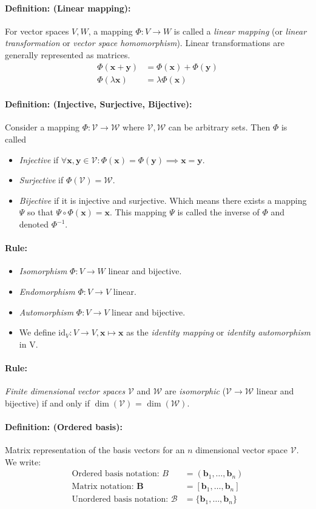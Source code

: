 \documentclass[12pt]{article}
\newcommand{\vecs}[2]{{\bm{#1}_1, \dots, \bm{#1}_#2}}
\newcommand{\xdefinition}[2]{\paragraph{\colorbox{#1!30}{\textbf{Definition:}} (#2):}}
\newcommand{\xrule}[1]{\paragraph{\colorbox{#1!30}{\textbf{Rule:}}}}
\newcommand{\mc}[1]{\mathcal{#1}}
\begin{document}
\xdefinition{green}{Linear mapping} For vector spaces $V, W$, a mapping $\Phi : V \rightarrow W$ is called a \textit{linear mapping} (or \textit{linear transformation} or \textit{vector space homomorphism}). Linear transformations are generally represented as matrices.
%
\begin{equation}
\begin{aligned}
	\Phi(\bm{x} + \bm{y}) &= \Phi(\bm{x}) + \Phi(\bm{y}) \\
	\Phi(\lambda \bm{x}) &= \lambda \Phi(\bm{x})
\end{aligned}
\end{equation}

\xdefinition{green}{Injective, Surjective, Bijective} Consider a mapping $\Phi : \mc{V} \rightarrow \mc{W}$ where $\mc{V}, \mc{W}$ can be arbitrary sets. Then $\Phi$ is called
%
\begin{itemize}
	\item \textit{Injective} if $\forall \bm{x}, \bm{y} \in \mc{V} : \Phi(\bm{x}) = \Phi(\bm{y}) \implies \bm{x} = \bm{y}$.
	\item \textit{Surjective} if $\Phi(\mc{V}) = \mc{W}$.
	\item \textit{Bijective} if it is injective and surjective. Which means there exists a mapping $\Psi$ so that $\Psi \circ \Phi(\bm{x}) = \bm{x}$. This mapping $\Psi$ is called the inverse of $\Phi$ and denoted $\Phi^{-1}$.
\end{itemize}

\xrule{blue}
%
\begin{itemize}
	\item \textit{Isomorphism} $\Phi : V \rightarrow W$ linear and bijective.
	\item \textit{Endomorphism} $\Phi : V \rightarrow V$ linear.
	\item \textit{Automorphism} $\Phi : V \rightarrow V$ linear and bijective.
	\item We define $\text{id}_V : V \rightarrow V, \bm{x} \mapsto \bm{x}$ as the \textit{identity mapping} or \textit{identity automorphism} in V.
\end{itemize}

\xrule{green} \textit{Finite dimensional vector spaces} $\mc{V}$ and $\mc{W}$ are \textit{isomorphic} ($\mc{V} \rightarrow \mc{W}$ linear and bijective) if and only if $\dim(\mc{V})$ = $\dim(\mc{W})$.

\xdefinition{green}{Ordered basis} Matrix representation of the basis vectors for an $n$ dimensional vector space $\mc{V}$. We write:
%
\begin{equation}
\begin{aligned}
	\text{Ordered basis notation: } B &= (\vecs{b}{n}) \\
	\text{Matrix notation: } \bm{B} &= [\vecs{b}{n}] \\
	\text{Unordered basis notation: } \mc{B} &= \{\vecs{b}{n}\}
\end{aligned}
\end{equation}
\end{document}
